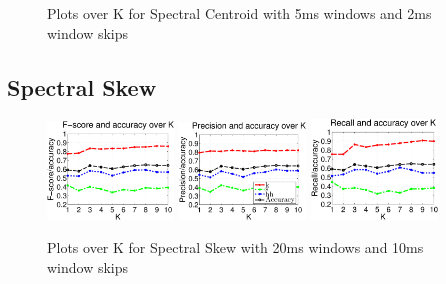 {{{\begin{figure}
				\caption{Plots over K for Spectral Centroid with 5ms windows and 2ms window skips}
		\end{figure}\clearpage
		
	\subsection{Spectral Skew}
			
		\begin{figure}
			\centering\includegraphics[width=0.3\textwidth]{tex/appendices/test/sskew2010FP.png}
			\centering\includegraphics[width=0.3\textwidth]{tex/appendices/test/sskew2010_P.png}
			\centering\includegraphics[width=0.3\textwidth]{tex/appendices/test/sskew2010_R.png}
			
			\caption{Plots over K for Spectral Skew with 20ms windows and 10ms window skips}
		\end{figure}
		
}}}
